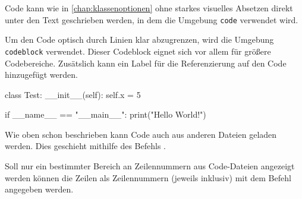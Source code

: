 Code kann wie in \autoref{chap:klassenoptionen} ohne starkes visuelles Absetzen direkt unter den Text geschrieben werden, in dem die Umgebung \texttt{code} verwendet wird.


Um den Code optisch durch Linien klar abzugrenzen, wird die Umgebung \texttt{codeblock} verwendet. Dieser Codeblock eignet sich vor allem für größere Codebereiche. Zusätslich kann ein Label für die Referenzierung auf den Code hinzugefügt werden.

\begin{code}[latex]
    \begin{codeblock}[python,label={code:python-class}]
        class Test:
            __init__(self):
                self.x = 5

        if __name__ == "__main__":
            print("Hello World!")
    \end{codeblock}
\end{code}

Wie oben schon beschrieben kann Code auch aus anderen Dateien geladen werden. Dies geschieht mithilfe des Befehls \texttt{}.

\begin{code}[latex]
\end{code}


Soll nur ein bestimmter Bereich an Zeilennummern aus Code-Dateien angezeigt werden können die Zeilen als Zeilennummern (jeweils inklusiv) mit dem Befehl \texttt{} angegeben werden.

\begin{code}[latex]
\end{code}

